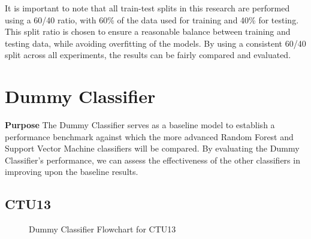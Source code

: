 It is important to note that all train-test splits in this research are performed using a 60/40 ratio, with 60\% of the data used for training and 40\% for testing. This split ratio is chosen to ensure a reasonable balance between training and testing data, while avoiding overfitting of the models. By using a consistent 60/40 split across all experiments, the results can be fairly compared and evaluated.

\section{Dummy Classifier}\label{sec:DummyClassifier}

\textbf{Purpose} The Dummy Classifier serves as a baseline model to establish a performance benchmark against which the more advanced Random Forest and Support Vector Machine classifiers will be compared. By evaluating the Dummy Classifier's performance, we can assess the effectiveness of the other classifiers in improving upon the baseline results.

\subsection{CTU13}

\begin{figure}[H]
\centering
{}
\caption{Dummy Classifier Flowchart for CTU13}\label{fig:DummyRandomFlowCTU13}
\end{figure}

